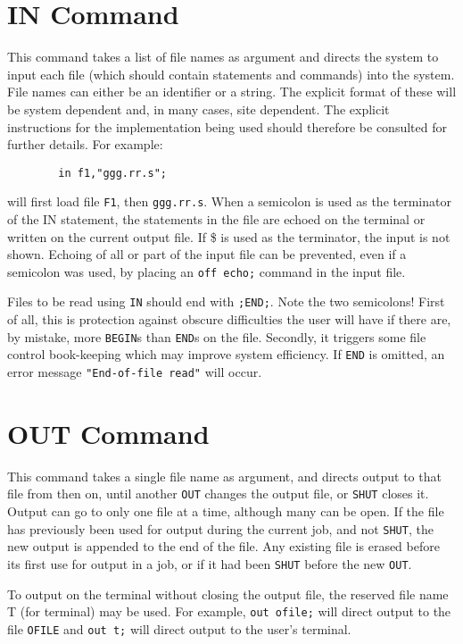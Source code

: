 \section{IN Command} 
This command takes a list of file names as argument and directs the system
to input  each file (which should contain {\REDUCE} statements
and commands) into the system.  File names can either be an identifier or
a string.  The explicit format of these will be system dependent and, in
many cases, site dependent.  The explicit instructions for the
implementation being used should therefore be consulted for further
details. For example:
\begin{verbatim}
        in f1,"ggg.rr.s";
\end{verbatim}
will first load file {\tt F1}, then {\tt ggg.rr.s}.  When a semicolon is
used as the terminator of the IN statement, the statements in the file are
echoed on the terminal or written on the current output file.  If \$
 is used as the terminator, the input is not
shown.  Echoing of all or part of the input file can be prevented, even if
a semicolon was used, by placing an {\tt off echo;}  command
in the input file.

Files to be read using {\tt IN} should end with {\tt ;END;}.  Note the two
semicolons!  First of all, this is protection against obscure difficulties
the user will have if there are, by mistake, more {\tt BEGIN}s than
{\tt END}s on the file.  Secondly, it triggers some file control book-keeping
which may improve system efficiency.  If {\tt END} is omitted, an error
message {\tt "End-of-file read"} will occur.

\section{OUT Command} 
This command takes a single file name as argument, and directs output to
that file from then on, until another {\tt OUT} changes the output file,
or {\tt SHUT} closes it.  Output can go to only one file at a time,
although many can be open.  If the file has previously been used for
output during the current job, and not {\tt SHUT},  the new
output is appended to the end of the file.  Any existing file is erased
before its first use for output in a job, or if it had been {\tt SHUT}
before the new {\tt OUT}.

To output on the terminal without closing the output file, the reserved
file name T (for terminal) may be used.  For example,
{\tt out ofile;} will direct output to the file {\tt OFILE} and
{\tt out t;} will direct output to the user's terminal.

